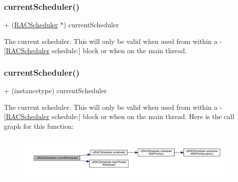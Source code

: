 \subsubsection{\texorpdfstring{current\+Scheduler()}{currentScheduler()}\hspace{0.1cm}{\footnotesize\ttfamily [1/3]}}
{\footnotesize\ttfamily + (\mbox{\hyperlink{interface_r_a_c_scheduler}{R\+A\+C\+Scheduler}} $\ast$) current\+Scheduler \begin{DoxyParamCaption}{ }\end{DoxyParamCaption}}

The current scheduler. This will only be valid when used from within a -\/\mbox{[}\mbox{\hyperlink{interface_r_a_c_scheduler}{R\+A\+C\+Scheduler}} schedule\+:\mbox{]} block or when on the main thread. \mbox{\label{interface_r_a_c_scheduler_a8019577be2939f511255ac535a6f742b}} 
\subsubsection{\texorpdfstring{current\+Scheduler()}{currentScheduler()}\hspace{0.1cm}{\footnotesize\ttfamily [2/3]}}
{\footnotesize\ttfamily + (instancetype) current\+Scheduler \begin{DoxyParamCaption}{ }\end{DoxyParamCaption}}

The current scheduler. This will only be valid when used from within a -\/\mbox{[}\mbox{\hyperlink{interface_r_a_c_scheduler}{R\+A\+C\+Scheduler}} schedule\+:\mbox{]} block or when on the main thread. Here is the call graph for this function\+:\nopagebreak
\begin{figure}[H]
\begin{center}
\leavevmode
\includegraphics[width=350pt]{interface_r_a_c_scheduler_a8019577be2939f511255ac535a6f742b_cgraph}
\end{center}
\end{figure}
\mbox{\label{interface_r_a_c_scheduler_a67734f655b47abc041b32021cf72c017}} 
